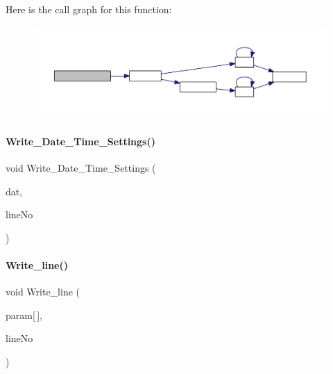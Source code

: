 Here is the call graph for this function\+:
\nopagebreak
\begin{figure}[H]
\begin{center}
\leavevmode
\includegraphics[width=350pt]{a00035_a754f53f3cd8f30c8c0211fdb4f548a31_cgraph}
\end{center}
\end{figure}
\mbox{\label{a00035_abb51fc5924666908faf69cacd834b0e6}} 
\paragraph{Write\+\_\+\+Date\+\_\+\+Time\+\_\+\+Settings()}
{\footnotesize\ttfamily void Write\+\_\+\+Date\+\_\+\+Time\+\_\+\+Settings (\begin{DoxyParamCaption}\item[{\textbf{ Date\+Time}}]{dat,  }\item[{int}]{line\+No }\end{DoxyParamCaption})}

\mbox{\label{a00035_a7a79900a1e7306db896b33ca4a068108}} 
\paragraph{Write\+\_\+line()}
{\footnotesize\ttfamily void Write\+\_\+line (\begin{DoxyParamCaption}\item[{char}]{param[$\,$],  }\item[{int}]{line\+No }\end{DoxyParamCaption})}

